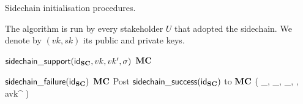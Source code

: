 \begin{algorithm}[H]
  \caption{\label{alg.init}Sidechain initialisation procedures.}
  \smallskip
  The algorithm is run by every stakeholder $U$ that adopted the sidechain. We
  denote by $(vk,sk)$ its public and private keys.
  \smallskip
  \begin{algorithmic}[1]
    \On{$\SidechainAdoption(\idSC)$}
      \Let{\scstate[\idSC]}{\initializing}
      \Post
        {$\mathsf{sidechain\_support}(\mathsf{id}_{\mathbf{SC}},vk,vk',\sigma)$}
        {$\mathbf{MC}$}
    \EndOn

      \If{$\scstate[\idSC]=\initializing$}
        \If{$\ActFail()$}
          \Let{\scstate[\idSC]}{\failed}
          \Post
            {$\mathsf{sidechain\_failure}(\mathsf{id}_{\mathbf{SC}})$}
            {$\mathbf{MC}$}
        \ElsIf{$\ActSuccess()$}
          \Let{\scstate[\idSC]}{\initialized}
          \Let{\jstart}{\ActEpoch()}
          \State Post $\mathsf{sidechain\_success}(\mathsf{id}_{\mathbf{SC}})$ to $\mathbf{MC}$
        \EndIf
      \EndIf
        \Let{\Genesisb}
          {\left(
            \id_\SC,
            \SDb_{\jstart},
            \rndb_{\jstart},
            \params,
            avk^{\jstart}
          \right)}
        \Let{\ChainSC}{(\Genesisb)}
      \EndIf
    \EndOn
  \end{algorithmic}
\end{algorithm}
